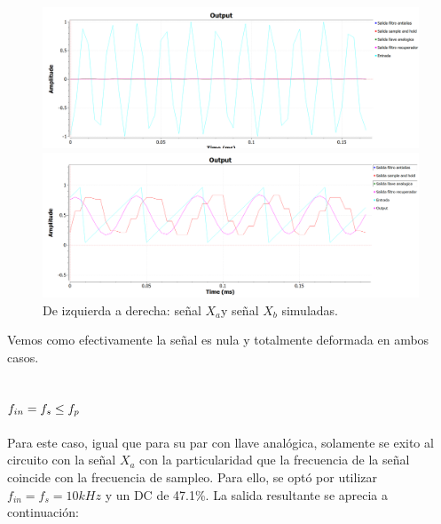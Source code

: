 \documentclass[../../ASSD_TP1_G7.tex]{subfiles}
\begin{document}
\begin{figure}[H]

\begin{centering}
\includegraphics[scale=0.5]{Imagenes/simulacion_syh_seno_b2}
\par\end{centering}
\begin{centering}
\includegraphics[scale=0.5]{Imagenes/simulacion_syh_diente_b2}\caption{De izquierda a derecha: señal $X_{a}$y señal $X_{b}$ simuladas.}
\par\end{centering}
\end{figure}

Vemos como efectivamente la señal es nula y totalmente deformada en
ambos casos.

\subsection{$f_{in}=f_{s}\protect\leq f_{p}$}

Para este caso, igual que para su par con llave analógica, solamente
se exito al circuito con la señal $X_{a}$ con la particularidad que
la frecuencia de la señal coincide con la frecuencia de sampleo. Para
ello, se optó por utilizar $f_{in}=f_{s}=10kHz$ y un DC de 47.1\%.
La salida resultante se aprecia a continuación:
\end{document}
